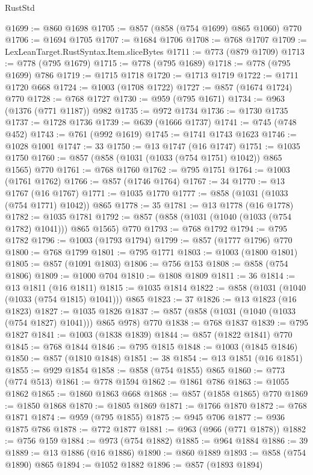 \begin{lexlean}{RustStd}
\begin{coremodule}
@1699 := @860 @1698
@1705 := @857 (@858 (@754 @1699) @865 @1060) @770
@1706 := @1694 @1705
@1707 := @1684 @1706
@1708 := @768 @1707
@1709 := LexLeanTarget.RustSyntax.Item.sliceBytes
@1711 := @773 (@879 @1709)
@1713 := @778 (@795 @1679)
@1715 := @778 (@795 @1689)
@1718 := @778 (@795 @1699) @786
@1719 := @1715 @1718
@1720 := @1713 @1719
@1722 := @1711 @1720 @668
@1724 := @1003 (@1708 @1722)
@1727 := @857 (@1674 @1724) @770
@1728 := @768 @1727
@1730 := @959 (@795 @1671)
@1734 := @963 (@1376 (@771 @1187)) @982
@1735 := @972 @1734
@1736 := @1730 @1735
@1737 := @1728 @1736
@1739 := @639 (@1666 @1737)
@1741 := @745 (@748 @452)
@1743 := @761 (@992 @1619)
@1745 := @1741 @1743 @1623
@1746 := @1028 @1001
@1747 := 33
@1750 := @13 @1747 (@16 @1747)
@1751 := @1035 @1750
@1760 := @857 (@858 (@1031 (@1033 (@754 @1751) @1042)) @865 @1565) @770
@1761 := @768 @1760
@1762 := @795 @1751
@1764 := @1003 (@1761 @1762)
@1766 := @857 (@1746 @1764)
@1767 := 34
@1770 := @13 @1767 (@16 @1767)
@1771 := @1035 @1770
@1777 := @858 (@1031 (@1033 (@754 @1771) @1042)) @865
@1778 := 35
@1781 := @13 @1778 (@16 @1778)
@1782 := @1035 @1781
@1792 := @857 (@858 (@1031 (@1040 (@1033 (@754 @1782) @1041))) @865 @1565) @770
@1793 := @768 @1792
@1794 := @795 @1782
@1796 := @1003 (@1793 @1794)
@1799 := @857 (@1777 @1796) @770
@1800 := @768 @1799
@1801 := @795 @1771
@1803 := @1003 (@1800 @1801)
@1805 := @857 (@1091 @1803)
@1806 := @756 @153
@1808 := @858 (@754 @1806)
@1809 := @1000 @704
@1810 := @1808 @1809
@1811 := 36
@1814 := @13 @1811 (@16 @1811)
@1815 := @1035 @1814
@1822 := @858 (@1031 (@1040 (@1033 (@754 @1815) @1041))) @865
@1823 := 37
@1826 := @13 @1823 (@16 @1823)
@1827 := @1035 @1826
@1837 := @857 (@858 (@1031 (@1040 (@1033 (@754 @1827) @1041))) @865 @978) @770
@1838 := @768 @1837
@1839 := @795 @1827
@1841 := @1003 (@1838 @1839)
@1844 := @857 (@1822 @1841) @770
@1845 := @768 @1844
@1846 := @795 @1815
@1848 := @1003 (@1845 @1846)
@1850 := @857 (@1810 @1848)
@1851 := 38
@1854 := @13 @1851 (@16 @1851)
@1855 := @929 @1854
@1858 := @858 (@754 @1855) @865
@1860 := @773 (@774 @513)
@1861 := @778 @1594
@1862 := @1861 @786
@1863 := @1055 @1862
@1865 := @1860 @1863 @668
@1868 := @857 (@1858 @1865) @770
@1869 := @1850 @1868
@1870 := @1805 @1869
@1871 := @1766 @1870
@1872 := @768 @1871
@1874 := @959 (@795 @1855)
@1875 := @945 @706
@1877 := @936 @1875 @786
@1878 := @772 @1877
@1881 := @963 (@966 (@771 @1878))
@1882 := @756 @159
@1884 := @973 (@754 @1882)
@1885 := @964 @1884
@1886 := 39
@1889 := @13 @1886 (@16 @1886)
@1890 := @860 @1889
@1893 := @858 (@754 @1890) @865
@1894 := @1052 @1882
@1896 := @857 (@1893 @1894)

\end{coremodule}
\end{lexlean}
